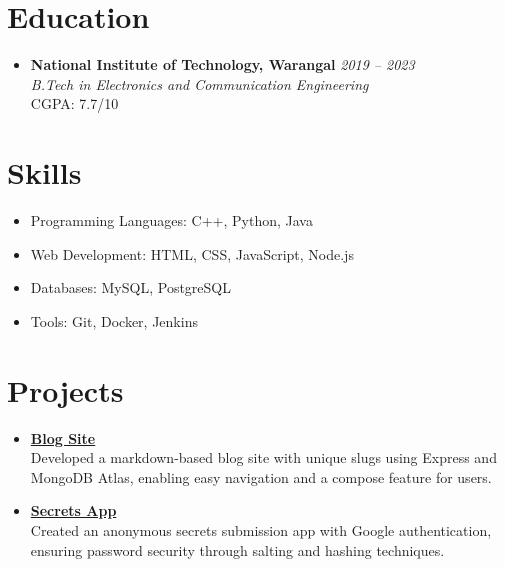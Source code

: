 \documentclass[a4paper,10pt]{article} %
\begin{document}
\vspace{0.001em} %
\section*{Education}
\begin{itemize}[leftmargin=0.3in, itemsep=3pt, topsep=2pt]
    \item
    \textbf{National Institute of Technology, Warangal} \hfill \textit{2019 – 2023} \\
    \textit{B.Tech in Electronics and Communication Engineering} \\
    CGPA: 7.7/10
\end{itemize}
\vspace{0.001em} %
\section*{Skills}
\begin{multicols}{2}  %
    \begin{itemize}[leftmargin=0.3in, itemsep=0.7pt, topsep=2pt]
        \item Programming Languages: C++, Python, Java
        \item Web Development: HTML, CSS, JavaScript, Node.js
    \end{itemize}
    \begin{itemize}[leftmargin=0.3in, itemsep=0.7pt, topsep=2pt]
        \item Databases: MySQL, PostgreSQL
        \item Tools: Git, Docker, Jenkins
    \end{itemize}
\end{multicols}
\vspace{0.001em} %
\section*{Projects}
\begin{itemize}[leftmargin=0.3in, itemsep=3pt, topsep=0pt] %
    \item \textbf{\href{<insert_blog_site_url_here>}{Blog Site}} \\
    Developed a markdown-based blog site with unique slugs using Express and MongoDB Atlas, enabling easy navigation and a compose feature for users.
    
    \item \textbf{\href{<insert_secrets_app_url_here>}{Secrets App}} \\
    Created an anonymous secrets submission app with Google authentication, ensuring password security through salting and hashing techniques.
\end{itemize}
\vspace{0.001em} %
\end{document}
